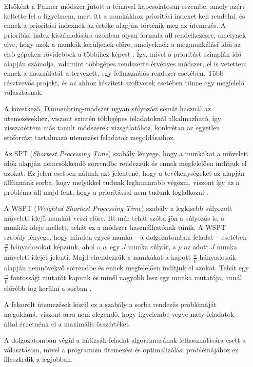 
Elsőként a Palmer módszer jutott a témával kapcsolatosan eszembe, amely azért keltette fel a figyelmem, mert itt a munkákhoz prioritási indexet kell rendelni, és ennek a prioritási indexnek az értéke alapján történik meg az ütemezés. A prioritási index kiszámolására azonban olyan formula áll rendelkezésre, amelynek elve, hogy azok a munkák kerüljenek előre, amelyeknek a megmunkálási idői az első gépeken rövidebbek a többihez képest \cite{palmer}. Így, mivel a prioritást szimplán idő alapján számolja, valamint többgépes rendszerre érvényes módszer, el is vetettem ennek a használatát a tervezett, egy felhasználós rendszer esetében. Több résztvevős projekt, és az ahhoz készített szoftverek esetében tünne egy megfelelő választásnak.


A következő, Dannenbring-módszer ugyan súlyozási sémát használ az ütemezésekhez, viszont szintén többgépes feladatoknál alkalmazható, így visszatértem más tanult módszerek vizsgálatához, konkrétan az egyetlen erőforrást tartalmazó ütemezési feladatok megoldásaihoz.


Az SPT (\textit{Shortest Processing Time}) szabály lényege, hogy a munkákat a műveleti idők alapján nemcsökkendő sorrendbe rendezzük és ennek megfelelően indítjuk el azokat. Ez jelen esetben nálunk azt jelentené, hogy a tevékenységeket az alapján állítanánk sorba, hogy melyikkel tudunk leghamarabb végezni, viszont így az a probléma áll majd fent, hogy a prioritással nem tudunk foglalkozni \cite{sptwspt}.


A WSPT (\textit{Weighted Shortest Processing Time}) szabály a legkisebb súlyozott műveleti idejű munkát veszi előre. Itt már tehát szóba jön a súlyozás is, a munkák ideje mellett, tehát ez a módszer használhatónak tűnik. A WSPT szabály lényege, hogy minden egyes munka -- a dolgozatomban feladat -- esetében $\frac{w}{p}$ hányadosokat képzünk, ahol a $w$ egy $J$ munka súlyát, a $p$ az adott $J$ munka műveleti idejét jelenti. Majd elrendezzük a munkákat a kapott $\frac{w}{p}$ hányadosaik alapján nemnövekvő sorrendbe és ennek megfelelően indítjuk el azokat.
Tehát egy $\frac{w}{p}$ fontossági mutatót kapunk és minél nagyobb lesz egy munka mutatója, annál előrébb fog kerülni a sorban \cite{sptwspt}.

A felsorolt ütemezések közül ez a szabály a sorba rendezés problémáját megoldaná, viszont arra nem elegendő, hogy figyelembe vegye mely feladatok által érhetnénk el a maximális összértéket.

A dolgozatomban végül a hátizsák feladat algoritmusának felhasználására esett a választásom, mivel a programom ütemezési és optimalizálási problémájához ez illeszkedik a legjobban.
